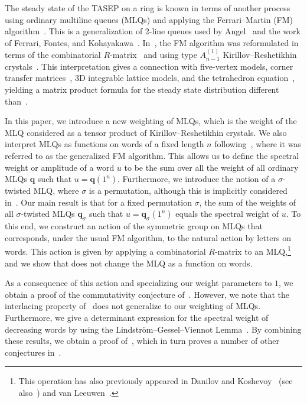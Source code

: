 \documentclass[reqno]{amsart}
\newcommand{\0}{\phantom{c}}
\newcommand{\qq}{\mathbf{q}}
\theoremstyle{plain}
\theoremstyle{definition}
\numberwithin{equation}{section}
\begin{document}
The steady state of the TASEP on a ring is known in terms of another process using ordinary multiline queues (MLQs) and applying the Ferrari--Martin (FM) algorithm~\cite{FM06,FM07}.
This is a generalization of 2-line queues used by Angel~\cite{Angel06} and the work of Ferrari, Fontes, and Kohayakawa~\cite{FFK94}.
In~\cite{KMO15,KMO16}, the FM algorithm was reformulated in terms of the combinatorial $R$-matrix~\cite{NY97,Shimozono02} and using type $A_{n-1}^{(1)}$ Kirillov--Reshetikhin crystals~\cite{KKMMNN92}.
This interpretation gives a connection with five-vertex models, corner transfer matrices~\cite{Baxter89}, 3D integrable lattice models, and the tetrahedron equation~\cite{Zam80}, yielding a matrix product formula for the steady state distribution different than~\cite{CdGW15,EFM09,PEM09}.

In this paper, we introduce a new weighting of MLQs, which is the weight of the MLQ considered as a tensor product of Kirillov--Reshetikhin crystals.
We also interpret MLQs as functions on words of a fixed length $n$ following~\cite{AAMP}, where it was referred to as the generalized FM algorithm.
This allows us to define the spectral weight or amplitude of a word $u$ to be the sum over all the weight of all ordinary MLQs $\qq$ such that $u = \qq(1^n)$.
Furthermore, we introduce the notion of a $\sigma$-twisted MLQ, where $\sigma$ is a permutation, although this is implicitly considered in~\cite{AAMP}.
Our main result is that for a fixed permutation $\sigma$, the sum of the weights of all $\sigma$-twisted MLQs $\qq_{\sigma}$ such that $u = \qq_{\sigma}(1^n)$ equals the spectral weight of $u$.
To this end, we construct an action of the symmetric group on MLQs that corresponds, under the usual FM algorithm, to the natural action by letters on words.
This action is given by applying a combinatorial $R$-matrix to an MLQ,\footnote{This operation has also previously appeared in Danilov and Koshevoy~\cite{DanilovKoshevoy} (see also~\cite[Ch.~4]{Gorodentsev2}) and van Leeuwen~\cite[Lemma~2.3]{vanLeeuwen-dc}.} and we show that does not change the MLQ as a function on words.

As a consequence of this action and specializing our weight parameters to $1$, we obtain a proof of the commutativity conjecture of~\cite{AAMP}.
However, we note that the interlacing property of~\cite{AAMP} does not generalize to our weighting of MLQs.
Furthermore, we give a determinant expression for the spectral weight of decreasing words by using the Lindstr\"om--Gessel--Viennot Lemma~\cite{GV85,Lindstrom73}.
By combining these results, we obtain a proof of~\cite[Conj.~3.10]{AasLin17}, which in turn proves a number of other conjectures in~\cite{AasLin17}.
\end{document}
